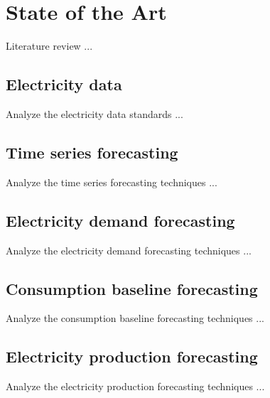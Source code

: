\chapter{State of the Art}
\label{cha:soa}
\vspace{0.4 cm}

Literature review ...


\section{Electricity data}
\label{sec:data}
\vspace{0.2 cm}

Analyze the electricity data standards ...
\cite{coulouris}


\section{Time series forecasting}
\label{sec:timeseries}
\vspace{0.2 cm}

Analyze the time series forecasting techniques ...


\section{Electricity demand forecasting}
\label{sec:demandsoa}
\vspace{0.2 cm}

Analyze the electricity demand forecasting techniques ...


\section{Consumption baseline forecasting}
\label{sec:baselinesoa}
\vspace{0.2 cm}

Analyze the consumption baseline forecasting techniques ...


\section{Electricity production forecasting}
\label{sec:productionsoa}
\vspace{0.2 cm}

Analyze the electricity production forecasting techniques ...
